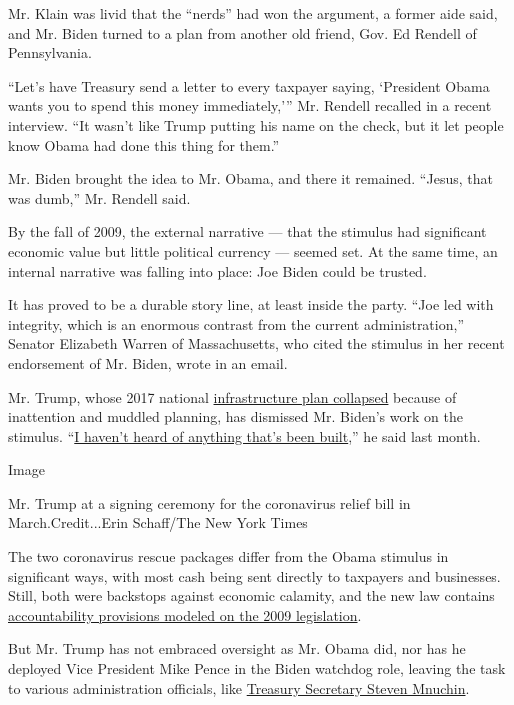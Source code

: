 Mr. Klain was livid that the ``nerds'' had won the argument, a former
aide said, and Mr. Biden turned to a plan from another old friend, Gov.
Ed Rendell of Pennsylvania.

``Let's have Treasury send a letter to every taxpayer saying, `President
Obama wants you to spend this money immediately,''' Mr. Rendell recalled
in a recent interview. ``It wasn't like Trump putting his name on the
check, but it let people know Obama had done this thing for them.''

Mr. Biden brought the idea to Mr. Obama, and there it remained. ``Jesus,
that was dumb,'' Mr. Rendell said.

By the fall of 2009, the external narrative --- that the stimulus had
significant economic value but little political currency --- seemed set.
At the same time, an internal narrative was falling into place: Joe
Biden could be trusted.

It has proved to be a durable story line, at least inside the party.
``Joe led with integrity, which is an enormous contrast from the current
administration,'' Senator Elizabeth Warren of Massachusetts, who cited
the stimulus in her recent endorsement of Mr. Biden, wrote in an email.

Mr. Trump, whose 2017 national
\href{https://www.nytimes3xbfgragh.onion/2017/07/23/us/trump-infrastructure-program.html}{infrastructure
plan collapsed} because of inattention and muddled planning, has
dismissed Mr. Biden's work on the stimulus.
``\href{https://www.npr.org/2017/04/05/522629542/fact-check-trumps-claim-2009-stimulus-measure-built-nothing}{I
haven't heard of anything that's been built},'' he said last month.

Image

Mr. Trump at a signing ceremony for the coronavirus relief bill in
March.Credit...Erin Schaff/The New York Times

The two coronavirus rescue packages differ from the Obama stimulus in
significant ways, with most cash being sent directly to taxpayers and
businesses. Still, both were backstops against economic calamity, and
the new law contains
\href{https://oversight.house.gov/news/press-releases/coronavirus-package-includes-oversight-and-accountability-measures}{accountability
provisions modeled on the 2009 legislation}.

But Mr. Trump has not embraced oversight as Mr. Obama did, nor has he
deployed Vice President Mike Pence in the Biden watchdog role, leaving
the task to various administration officials, like
\href{https://www.bloomberg.com/news/articles/2020-04-24/mnuchin-asks-for-equity-stakes-in-exchange-for-17-billion-aid}{Treasury
Secretary Steven Mnuchin}.

